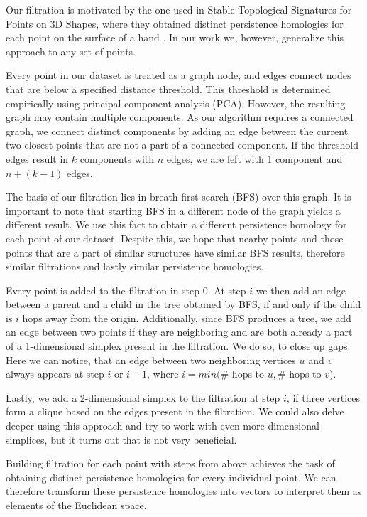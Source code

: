 \documentclass{article}
\begin{document}
Our filtration is motivated by the one used in Stable Topological Signatures for Points on 3D Shapes, where they obtained distinct persistence homologies for each point on the surface of a hand \cite{carriere2015stable}. In our work we, however, generalize this approach to any set of points.

Every point in our dataset is treated as a graph node, and edges connect nodes that are below a specified distance threshold. 
This threshold is determined empirically using principal component analysis (PCA).
However, the resulting graph may contain multiple components. 
As our algorithm requires a connected graph, we connect distinct components by adding an edge between the current two closest points that are not a part of a connected component.
If the threshold edges result in $k$ components with $n$ edges, we are left with 1 component and $n+(k-1)$ edges.  

The basis of our filtration lies in breath-first-search (BFS) over this graph. 
It is important to note that starting BFS in a different node of the graph yields a different result. 
We use this fact to obtain a different persistence homology for each point of our dataset.
Despite this, we hope that nearby points and those points that are a part of similar structures have similar BFS results, therefore similar filtrations and lastly similar persistence homologies.

Every point is added to the filtration in step 0.
At step $i$ we then add an edge between a parent and a child in the tree obtained by BFS, if and only if the child is $i$ hops away from the origin.
Additionally, since BFS produces a tree, we add an edge between two points if they are neighboring and are both already a part of a 1-dimensional simplex present in the filtration. 
We do so, to close up gaps.
Here we can notice, that an edge between two neighboring vertices $u$ and $v$ always appears at step $i$ or $i + 1$, where $i = min(\#$ hops to $u,\#$ hops to $v$).

Lastly, we add a 2-dimensional simplex to the filtration at step $i$, if three vertices form a clique based on the edges present in the filtration.
We could also delve deeper using this approach and try to work with even more dimensional simplices, but it turns out that is not very beneficial.

Building filtration for each point with steps from above achieves the task of obtaining distinct persistence homologies for every individual point.
We can therefore transform these persistence homologies into vectors to interpret them as elements of the Euclidean space.
\end{document}
